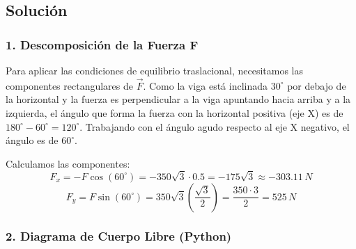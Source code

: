\documentclass[12pt, a4paper]{article}
\begin{document}
\begin{center}
\end{center}

\subsection*{Solución}

\subsubsection*{1. Descomposición de la Fuerza F}
Para aplicar las condiciones de equilibrio traslacional, necesitamos las componentes rectangulares de $\vec{F}$.
Como la viga está inclinada $30^\circ$ por debajo de la horizontal y la fuerza es perpendicular a la viga apuntando hacia arriba y a la izquierda, el ángulo que forma la fuerza con la horizontal positiva (eje X) es de $180^\circ - 60^\circ = 120^\circ$. Trabajando con el ángulo agudo respecto al eje X negativo, el ángulo es de $60^\circ$.

Calculamos las componentes:
$$F_x = -F \cos(60^\circ) = -350\sqrt{3} \cdot 0.5 = -175\sqrt{3} \approx -303.11 \, \si{N}$$
$$F_y = F \sin(60^\circ) = 350\sqrt{3} \left( \frac{\sqrt{3}}{2} \right) = \frac{350 \cdot 3}{2} = 525 \, \si{N}$$

\subsubsection*{2. Diagrama de Cuerpo Libre (Python)}
\end{document}
